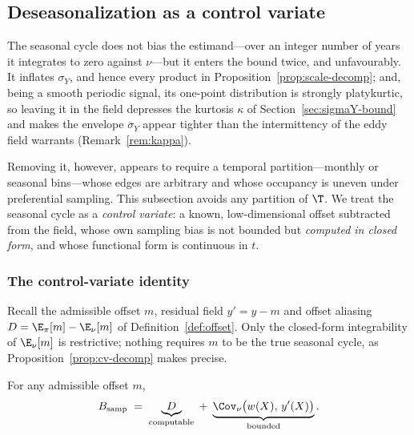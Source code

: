 \subsection{Deseasonalization as a control variate}
\label{sec:deseason}

The seasonal cycle does not bias the estimand---over an integer number of
years it integrates to zero against $\nu$---but it enters the bound
twice, and unfavourably. It inflates $\sigma_Y$, and hence every product
in Proposition~\ref{prop:scale-decomp}; and, being a smooth periodic
signal, its one-point distribution is strongly platykurtic, so leaving it
in the field depresses the kurtosis $\kappa$ of
Section~\ref{sec:sigmaY-bound} and makes the envelope
$\overline{\sigma}_Y$ appear tighter than the intermittency of the eddy
field warrants (Remark~\ref{rem:kappa}).

Removing it, however, appears to require a temporal partition---monthly
or seasonal bins---whose edges are arbitrary and whose occupancy is
uneven under preferential sampling. This subsection avoids any partition
of $\T$. We treat the seasonal cycle as a \emph{control variate}: a
known, low-dimensional offset subtracted from the field, whose own
sampling bias is not bounded but \emph{computed in closed form}, and
whose functional form is continuous in $t$.

\subsubsection{The control-variate identity}
\label{sec:cv-identity}

Recall the admissible offset $m$, residual field $y'=y-m$ and offset
aliasing $D=\E_\pi[m]-\E_\nu[m]$ of Definition~\ref{def:offset}. Only the
closed-form integrability of $\E_\nu[m]$ is restrictive; nothing requires
$m$ to be the true seasonal cycle, as Proposition~\ref{prop:cv-decomp}
makes precise.

\begin{proposition}
\label{prop:cv-decomp}
For any admissible offset $m$,
\[
  B_{\mathrm{samp}}
  \;=\;\underbrace{D}_{\text{computable}}
  \;+\;\underbrace{\Cov_\nu\big(w(X),\,y'(X)\big)}_{\text{bounded}} .
\]
\end{proposition}

